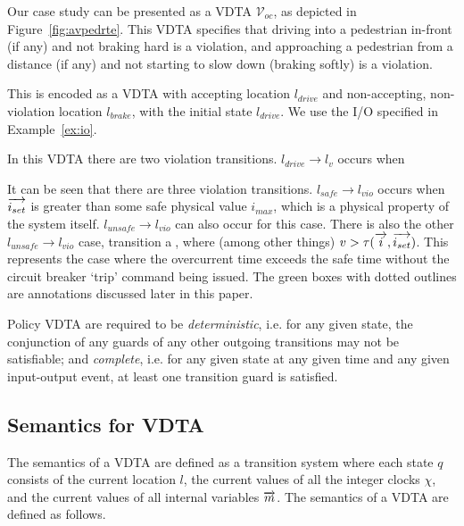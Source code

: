 \begin{example}
	Our case study can be presented as a \ac{VDTA} $\mathcal{V}_{oc}$, as depicted in Figure~\ref{fig:avpedrte}. 
	This \ac{VDTA} specifies that driving into a pedestrian in-front (if any) and not braking hard is a violation, and approaching a pedestrian from a distance (if any) and not starting to slow down (braking softly) is a violation.
	
	This is encoded as a \ac{VDTA} with accepting location $l_{drive}$ and non-accepting, non-violation location $l_{brake}$, with the initial state $l_{drive}$.
	We use the I/O specified in Example~\ref{ex:io}.
	
	In this \ac{VDTA} there are two violation transitions.
	$l_{drive} \rightarrow l_v$ occurs when 
	
	It can be seen that there are three violation transitions.
	$l_{safe} \rightarrow l_{vio}$ occurs when $\overrightarrow{i_{set}}$ is greater than some safe physical value $i_{max}$, which is a physical property of the system itself. 
	$l_{unsafe} \rightarrow l_{vio}$ can also occur for this case.
	There is also the other $l_{unsafe} \rightarrow l_{vio}$ case, transition \textcircled{a}, where (among other things) $v > \tau(\overrightarrow{i}, \overrightarrow{i_{set}})$.
	This represents the case where the overcurrent time exceeds the safe time without the circuit breaker `trip' command being issued.
	The green boxes with dotted outlines are annotations discussed later in this paper.
\end{example}

Policy \ac{VDTA} are required to be \textit{deterministic}, i.e. for any given state, the conjunction of any guards of any other outgoing transitions may not be satisfiable; and \textit{complete}, i.e. for any given state at any given time and any given input-output event, at least one transition guard is satisfied.

\subsection{Semantics for \ac{VDTA}}

The semantics of a \ac{VDTA} are defined as a transition system where each state $q$ consists of the current location $l$, the current values of all the integer clocks $\chi$, and the current values of all internal variables $\overrightarrow{m}$.
The semantics of a \ac{VDTA} are defined as follows.

